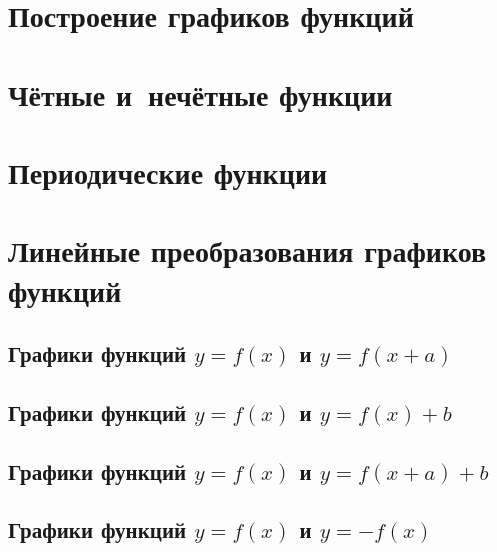 \documentclass[14pt, oneside]{extbook}
\begin{document}
\section{Построение графиков функций}

\section{Чётные и~нечётные функции}

\section{Периодические функции}\label{sec_1_9}

\section{Линейные преобразования графиков функций}\label{sec_1_10}

\subsection{Графики функций $y = f(x)$ и $y = f(x + a)$}
\label{sec_1_10_1}
\subsection{Графики функций $y = f(x)$ и $y = f(x) + b$}
\label{sec_1_10_2}
\subsection{Графики функций $y = f(x)$ и $y = f(x+a) + b$}
\label{sec_1_10_3}
\subsection{Графики функций $y = f(x)$ и $y = -f(x)$}
\label{sec_1_10_4}
\end{document}
